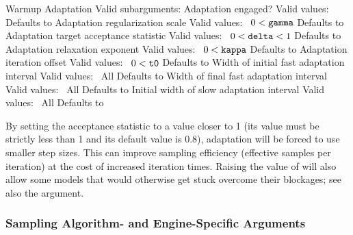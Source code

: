 \begin{description}
      {Warmup Adaptation}
      {Valid subarguments: }
%
        {Adaptation engaged?}
        {Valid values: \ }
        {Defaults to }
%
        {Adaptation regularization scale}
        {Valid values: \  $0 < \mbox{{\tt gamma}}$}
        {Defaults to }
%
        {Adaptation target acceptance statistic}
        {Valid values: \  $0 < \mbox{{\tt delta}} < 1$}
        {Defaults to }
%
        {Adaptation relaxation exponent}
        {Valid values: \  $0 < \mbox{\tt kappa}$}
        {Defaults to }
%
        {Adaptation iteration offset}
        {Valid values: \  $0 < \mbox{{\tt t0}}$}
        {Defaults to }
%
        {Width of initial fast adaptation interval}
        {Valid values: \ All}
        {Defaults to }
%
        {Width of final fast adaptation interval}
        {Valid values: \ All}
        {Defaults to }
%
        {Initial width of slow adaptation interval}
        {Valid values: \ All}
        {Defaults to }
%
\end{description}
%
By setting the acceptance statistic  to a value closer to
1 (its value must be strictly less than 1 and its default value is
0.8), adaptation will be forced to use smaller step sizes.  This can
improve sampling efficiency (effective samples per iteration) at the
cost of increased iteration times.  Raising the value of 
will also allow some models that would otherwise get stuck overcome
their blockages; see also the  argument.

\subsubsection{Sampling Algorithm- and Engine-Specific Arguments}

